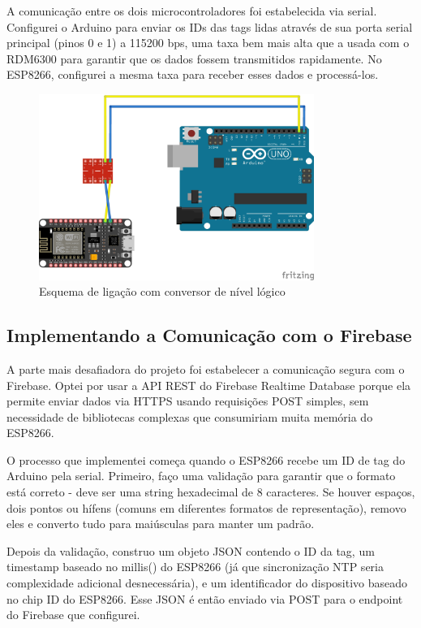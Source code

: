 A comunicação entre os dois microcontroladores foi estabelecida via serial. Configurei o Arduino para enviar os IDs das tags lidas através de sua porta serial principal (pinos 0 e 1) a 115200 bps, uma taxa bem mais alta que a usada com o RDM6300 para garantir que os dados fossem transmitidos rapidamente. No ESP8266, configurei a mesma taxa para receber esses dados e processá-los.

\begin{figure}[htbp!]
\centering
\includegraphics[width=0.8\textwidth]{pre-textuais/figuras/EsquemaArduinoESp.jpg}
\caption{Esquema de ligação com conversor de nível lógico}
\label{fig:conversor_nivel}
\end{figure}

\subsection{Implementando a Comunicação com o Firebase}

A parte mais desafiadora do projeto foi estabelecer a comunicação segura com o Firebase. Optei por usar a API REST do Firebase Realtime Database porque ela permite enviar dados via HTTPS usando requisições POST simples, sem necessidade de bibliotecas complexas que consumiriam muita memória do ESP8266.

O processo que implementei começa quando o ESP8266 recebe um ID de tag do Arduino pela serial. Primeiro, faço uma validação para garantir que o formato está correto - deve ser uma string hexadecimal de 8 caracteres. Se houver espaços, dois pontos ou hífens (comuns em diferentes formatos de representação), removo eles e converto tudo para maiúsculas para manter um padrão.

Depois da validação, construo um objeto JSON contendo o ID da tag, um timestamp baseado no millis() do ESP8266 (já que sincronização NTP seria complexidade adicional desnecessária), e um identificador do dispositivo baseado no chip ID do ESP8266. Esse JSON é então enviado via POST para o endpoint do Firebase que configurei.

